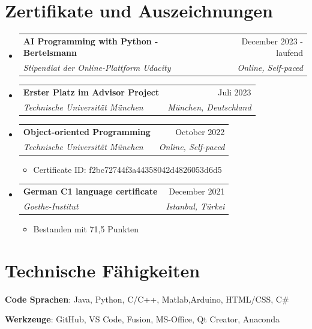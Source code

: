 \documentclass[a4paper,11pt]{article}
\makeatletter
\newcommand{\resumeItem}[1]{
  \item{
    {#1 \vspace{-4pt}}
  }
}
\newcommand{\resumeSubheading}[4]{
  \vspace{-2pt}\item
    \begin{tabular*}{0.97\textwidth}[t]{l@{\extracolsep{\fill}}r}
      \textbf{#1} & #2 \\
      \textit{\small #3} & \textit{\small #4} \\
    \end{tabular*}\vspace{-10pt}
}
\newcommand{\resumeSubHeadingListStart}{\begin{itemize}[leftmargin=0.15in, label={}]}
\newcommand{\resumeSubHeadingListEnd}{\end{itemize}}
\newcommand{\resumeItemListStart}{\begin{itemize}}
\newcommand{\resumeItemListEnd}{\end{itemize}\vspace{-2pt}}
\makeatother
\begin{document}
\section{Zertifikate und Auszeichnungen}
\resumeSubHeadingListStart
\resumeSubheading   
        {AI Programming with Python - Bertelsmann}{December 2023 - laufend}
        {Stipendiat der Online-Plattform Udacity}{Online, Self-paced}\break
        \vspace{0.1cm}
\resumeSubheading   
        {Erster Platz im Advisor Project}{Juli 2023}
        {Technische Universität München}{München, Deutschland}\break
        \vspace{0.1cm}
      
\resumeSubheading
        {Object-oriented Programming}{October 2022}
        {Technische Universität München}{Online, Self-paced}
      \resumeItemListStart
        \small\resumeItem{Certificate ID: f2bc72744f3a44358042d4826053d6d5}
        \vspace{0.1cm}
    \resumeItemListEnd
\resumeSubheading   
        {German C1 language certificate}{December 2021}
        {Goethe-Institut}{Istanbul, Türkei}
      \resumeItemListStart
        \small\resumeItem{Bestanden mit 71,5 Punkten}
    \resumeItemListEnd

\resumeSubHeadingListEnd



\section{Technische Fähigkeiten} 
\begin{itemize}[leftmargin=0.15in, label={}]
    \normalsize{\item{
     \textbf{Code Sprachen}{: Java, Python, C/C++, Matlab,Arduino, HTML/CSS, C\texxtbackslash\#} \\
     
     \item \textbf{Werkzeuge}{: GitHub, VS Code, Fusion, MS-Office, Qt Creator, Anaconda}\\
    }}
 \end{itemize}
\end{document}
